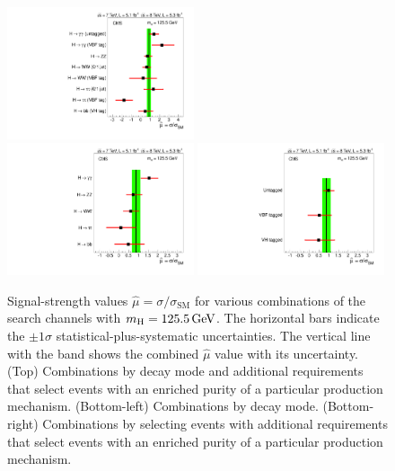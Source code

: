 \documentclass[11pt,twoside,a4paper,cmspaper,final,collab]{cms-tdr}
\begin{document}
\begin{figure} [htbp]
\centering
\includegraphics[width=0.49\textwidth]{figures/comb/sqr_mlzs_ccc_mH125p5_all} \\
\includegraphics[width=0.49\textwidth]{figures/comb/sqr_mlzs_ccc_mH125p5_decay}\hfill
\includegraphics[width=0.49\textwidth]{figures/comb/sqr_mlzs_ccc_mH125p5_prod}
\caption{
	Signal-strength values $\hat \mu = \sigma / \sigma_\mathrm{SM}$
	for various combinations of the search channels with $m_{\mathrm{H}}=125.5\,\text{Ge\hspace{-.08em}V}$.
	The horizontal bars indicate the $\pm 1 \sigma$ statistical-plus-systematic uncertainties.
	The  vertical line with the band shows the combined $\hat \mu$ value with its uncertainty.
(Top) Combinations by decay mode and additional requirements
      that select events with an enriched purity of a particular production mechanism.
(Bottom-left) Combinations by decay mode.
(Bottom-right) Combinations by selecting events with additional requirements that select events with an enriched purity of a
 particular production mechanism.
    }
\label{fig:muhat_compatibility}
\end{figure}
\end{document}
